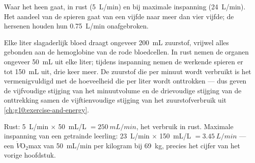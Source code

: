 \begin{omfigure}

{\small Waar het  heen gaat, in rust (\qty{5}{L/min}) en
bij maximale inspanning (\qty{24}{L/min}). Het aandeel van de spieren
gaat van een vijfde naar meer dan vier vijfde; de hersenen houden hun
\qty{0.75}{L/min} onafgebroken.}
\end{omfigure}

\begin{proposition}\label{prop:g10:heart-lungs-effort:extraction}
Elke liter slagaderlijk bloed draagt ongeveer \qty{200}{mL} zuurstof,
vrijwel alles gebonden aan de hemoglobine van de rode bloedcellen. In
rust nemen de organen ongeveer \qty{50}{mL} uit elke liter; tijdens
inspanning nemen de werkende spieren er tot \qty{150}{mL} uit, drie keer
meer. De zuurstof die per minuut wordt verbruikt is het 
vermenigvuldigd met de hoeveelheid die per liter wordt onttrokken --- dus
geven de vijfvoudige stijging van het minuutvolume en de drievoudige
stijging van de onttrekking samen de vijftienvoudige stijging van het
zuurstofverbruik uit \cref{ch:g10:exercise-and-energy}.
\end{proposition}
\admitted

\begin{example}\label{ex:g10:heart-lungs-effort:fick}
Rust: \qty{5}{L/min} $\times$ \qty{50}{mL/L} $= \qty{250}{mL/min}$, het
verbruik in rust. Maximale inspanning van een getrainde leerling:
\qty{23}{L/min} $\times$ \qty{150}{mL/L} $= \qty{3.45}{L/min}$ --- een
$\dot V\!\mathrm{O_2}$max van \qty{50}{mL/min} per kilogram bij
\qty{69}{kg}, precies het cijfer van het vorige hoofdstuk.
\end{example}

